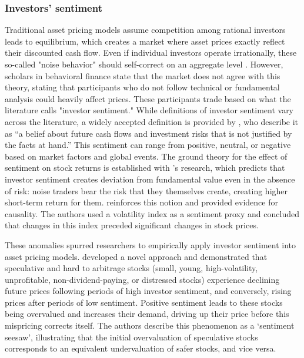 \subsubsection{Investors' sentiment}


Traditional asset pricing models assume competition among rational investors leads to equilibrium, which creates a market where asset prices exactly reflect their discounted cash flow. Even if individual investors operate irrationally, these so-called "noise behavior" should self-correct on an aggregate level \cite{friedman_1953}. However, scholars in behavioral finance state that the market does not agree with this theory, stating that participants who do not follow technical or fundamental analysis could heavily affect prices. These participants trade based on what the literature calls "investor sentiment." While definitions of investor sentiment vary across the literature, a widely accepted definition is provided by , who describe it as ``a belief about future cash flows and investment risks that is not justified by the facts at hand.'' This sentiment can range from positive, neutral, or negative based on market factors and global events. The ground theory for the effect of sentiment on stock returns is established with 's research, which predicts that investor sentiment creates deviation from fundamental value even in the absence of risk: noise traders bear the risk that they themselves create, creating higher short-term return for them.  reinforces this notion and provided evidence for causality. The authors used a volatility index as a sentiment proxy and concluded that changes in this index preceded significant changes in stock prices.


These anomalies spurred researchers to empirically apply investor sentiment into asset pricing models.  developed a novel approach and demonstrated that speculative and hard to arbitrage stocks (small, young, high-volatility, unprofitable, non-dividend-paying, or distressed stocks) experience declining future prices following periods of high investor sentiment, and conversely, rising prices after periods of low sentiment. Positive sentiment leads to these stocks being overvalued and increases their demand, driving up their price before this mispricing corrects itself. The authors describe this phenomenon as a `sentiment seesaw', illustrating that the initial overvaluation of speculative stocks corresponds to an equivalent undervaluation of safer stocks, and vice versa.

